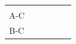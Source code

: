 {{\begin{center}
\begin{tabular}[t]{|l|l|l|l|l|l|}
         &
         &
         &
         &
     \tabularnewline\cline{1-1}\cline{2-2}\cline{3-3}\cline{4-4}\cline{5-5}\cline{6-6}
        A-C &
         &
         &
         &
         &
     \tabularnewline\cline{1-1}\cline{2-2}\cline{3-3}\cline{4-4}\cline{5-5}\cline{6-6}
        B-C &

\end{tabular}
\end{center}}}
